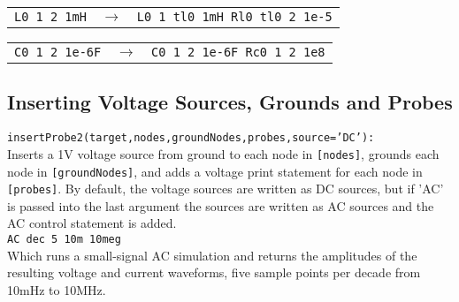 \documentclass[11pt,twoside]{mitthesis}
\begin{document}
\begin{tabular}{ c c  p{3cm} }
\texttt{L0 1 2 1mH} & $\rightarrow$ & \texttt{L0 1 tl0 1mH Rl0 tl0 2 1e-5} \\
\end{tabular}
\begin{tabular}{ |c  c  p{3cm} }
\texttt{C0 1 2 1e-6F} & $\rightarrow$ & \texttt{C0 1 2 1e-6F Rc0 1 2 1e8} \\
\end{tabular}

\subsection{Inserting Voltage Sources, Grounds and Probes}
\texttt{insertProbe2(target,nodes,groundNodes,probes,source='DC'):}\\
Inserts a 1V voltage source from ground to each node in \texttt{[nodes]}, grounds each node in \texttt{[groundNodes]}, and adds a voltage print statement for each node in \texttt{[probes]}.
By default, the voltage sources are written as DC sources, but if 'AC' is passed into the last argument the sources are written as AC sources and the AC control statement is added.\\
\texttt{AC dec 5 10m 10meg}\\
Which runs a small-signal AC simulation and returns the amplitudes of the resulting voltage and current waveforms, five sample points per decade from 10mHz to 10MHz.
\end{document}
